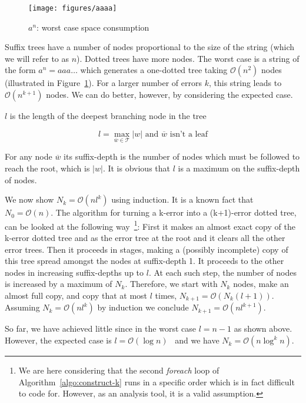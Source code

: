 \begin{figure}
\centering
\texttt{[image: figures/aaaa]}
\caption{$a^n$: worst case space consumption}%
\label{fig:aaaa}
\end{figure}

Suffix trees have a number of nodes proportional to the size of the string (which we will refer to as $n$). Dotted trees have more nodes. The worst case is a string of the form $a^n = aaa\dots$ which generates a one-dotted tree taking $\mathcal{O}(n^2)$ nodes (illustrated in Figure~\ref{fig:aaaa}). For a larger number of errors $k$, this string leads to $\mathcal{O}(n^{k+1})$ nodes. We can do better, however, by considering the expected case.

\begin{definition}
$l$ is the length of the deepest branching node in the tree

\[ l = \max_{\overline{w} \in \mathcal{T}} |w| \mbox{ and $\overline{w}$ isn't a leaf} \]
\end{definition}

\begin{definition}
For any node $\overline{w}$ its suffix-depth is the number of nodes which must be followed to reach the root, which is $|w|$. It is obvious that $l$ is a maximum on the suffix-depth of nodes.
\end{definition}

We now show $N_k = \mathcal{O}(nl^k)$ using induction. It is a known fact that $N_0 = \mathcal{O}(n)$. The algorithm for turning a k-error into a (k+1)-error dotted tree, can be looked at the following way~\footnote{We are here considering that the second \textit{foreach} loop of Algorithm~\ref{algo:construct-k} runs in a specific order which is in fact difficult to code for. However, as an analysis tool, it is a valid assumption.}: First it makes an almost exact copy of the k-error dotted tree and as the error tree at the root and it clears all the other error trees. Then it proceeds in stages, making a (possibly incomplete) copy of this tree spread amongst the nodes at suffix-depth 1. It proceeds to the other nodes in increasing suffix-depths up to $l$. At each such step, the number of nodes is increased by a maximum of $N_k$. Therefore, we start with $N_k$ nodes, make an almost full copy, and copy that at most $l$ times, $N_{k+1}=\mathcal{O}(N_k(l+1))$. Assuming $N_k=\mathcal{O}(nl^k)$ by induction we conclude $N_{k+1}=\mathcal{O}(nl^{k+1})$.

So far, we have achieved little since in the worst case $l=n-1$ as shown above. However, the expected case is $l=\mathcal{O}(\log n)$~\cite{apostolico92selfalignments,szpankowski:unexpected} and we have $N_k=\mathcal{O}(n\log^k n)$.
